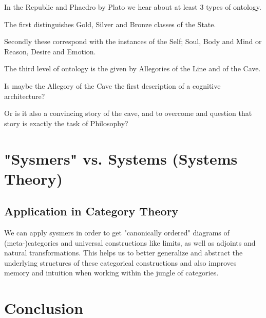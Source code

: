 \documentclass[12pt,a4paper, landscape]{article}
\begin{document}
In the Republic and Phaedro by Plato we hear about at least 3 types of ontology. 

The first distinguishes Gold, Silver and Bronze classes of the State.

Secondly these correspond with the instances of the Self; Soul, Body and Mind or Reason, Desire and Emotion.

The third level of ontology is the given by Allegories of the Line and of the Cave.

Is maybe the Allegory of the Cave the first description of a cognitive architecture?

Or is it also a convincing story of the cave, and to overcome and question that story is exactly the task of Philosophy? 
\section{"Sysmers" vs. Systems (Systems Theory)}

\subsection{Application in Category Theory}
We can apply sysmers in order to get "canonically ordered" diagrams of (meta-)categories and universal constructions like limits, as well as adjoints and natural transformations. This helps us to better generalize and abstract the underlying structures of these categorical constructions and also improves memory and intuition when working within the jungle of categories.


\section*{Conclusion}


\printbibliography
\end{document}
